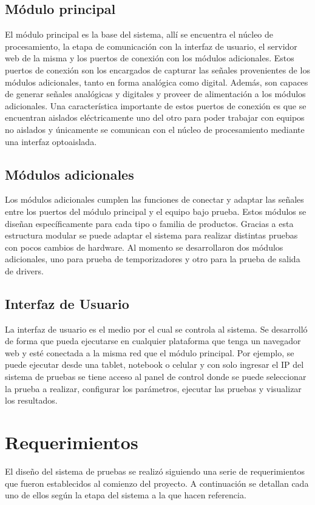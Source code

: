 \subsection{Módulo principal}
El módulo principal es la base del sistema, allí se encuentra el núcleo de procesamiento, la etapa de comunicación con la interfaz de usuario, el servidor web de la misma y los puertos de conexión con los módulos adicionales. Estos puertos de conexión son los encargados de capturar las señales provenientes de los módulos adicionales, tanto en forma analógica como digital. Además, son capaces de generar señales analógicas y digitales y proveer de alimentación a los módulos adicionales.
Una característica importante de estos puertos de conexión es que se encuentran aislados eléctricamente uno del otro para poder trabajar con equipos no aislados y únicamente se  comunican con el núcleo de procesamiento mediante una interfaz optoaislada.

\subsection{Módulos adicionales}
Los módulos adicionales cumplen las funciones de conectar y adaptar las señales entre los puertos del módulo principal y el equipo bajo prueba. Estos módulos se diseñan específicamente para cada tipo o familia de productos. Gracias a esta estructura modular se puede adaptar el sistema para realizar distintas pruebas con pocos cambios de hardware.
Al momento se desarrollaron dos módulos adicionales, uno para prueba de temporizadores y otro para la prueba de salida de drivers.

\subsection{Interfaz de Usuario}
La interfaz de usuario es el medio por el cual se controla al sistema. Se desarrolló de forma que pueda ejecutarse en cualquier plataforma que tenga un navegador web y esté conectada a la misma red que el módulo principal. Por ejemplo, se puede ejecutar desde una tablet, notebook o celular y con solo ingresar el IP del sistema de pruebas se tiene acceso al panel de control donde se puede seleccionar la prueba a realizar, configurar los parámetros, ejecutar las pruebas y visualizar los resultados.

\section{Requerimientos}
El diseño del sistema de pruebas se realizó siguiendo una serie de requerimientos que fueron establecidos al comienzo del proyecto. A continuación se detallan cada uno de ellos según la etapa del sistema a la que hacen referencia.


